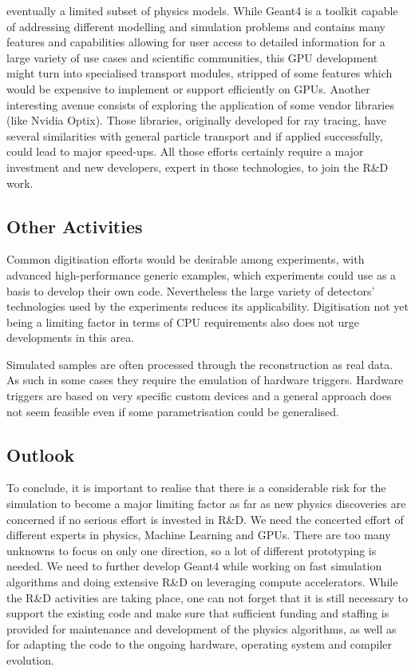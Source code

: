 \documentclass[11pt,a4paper]{article}
\begin{document}
eventually a limited subset of physics models. While Geant4 is a toolkit
capable of addressing different modelling and simulation problems and
contains many features and capabilities allowing for user access to
detailed information for a large variety of use cases and scientific
communities, this GPU development might turn into specialised transport
modules, stripped of some features which would be expensive to implement
or support efficiently on GPUs. Another interesting avenue consists of
exploring the application of some vendor libraries (like Nvidia Optix).
Those libraries, originally developed for ray tracing, have several
similarities with general particle transport and if applied
successfully, could lead to major speed-ups. All those efforts certainly
require a major investment and new developers, expert in those
technologies, to join the R\&D work.

\hypertarget{other-activities}{%
\subsection{Other Activities}\label{other-activities}}

Common digitisation efforts would be desirable among experiments, with
advanced high-performance generic examples, which experiments could use
as a basis to develop their own code. Nevertheless the large variety of
detectors' technologies used by the experiments reduces its
applicability. Digitisation not yet being a limiting factor in terms of
CPU requirements also does not urge developments in this area.

Simulated samples are often processed through the reconstruction as real
data. As such in some cases they require the emulation of hardware
triggers. Hardware triggers are based on very specific custom devices
and a general approach does not seem feasible even if some
parametrisation could be generalised.

\hypertarget{outlook}{%
\subsection{Outlook}\label{outlook}}

To conclude, it is important to realise that there is a considerable
risk for the simulation to become a major limiting factor as far as new
physics discoveries are concerned if no serious effort is invested in
R\&D. We need the concerted effort of different experts in physics,
Machine Learning and GPUs. There are too many unknowns to focus on only
one direction, so a lot of different prototyping is needed. We need to
further develop Geant4 while working on fast simulation algorithms and
doing extensive R\&D on leveraging compute accelerators. While the R\&D
activities are taking place, one can not forget that it is still
necessary to support the existing code and make sure that sufficient
funding and staffing is provided for maintenance and development of the
physics algorithms, as well as for adapting the code to the ongoing
hardware, operating system and compiler evolution.
\end{document}
